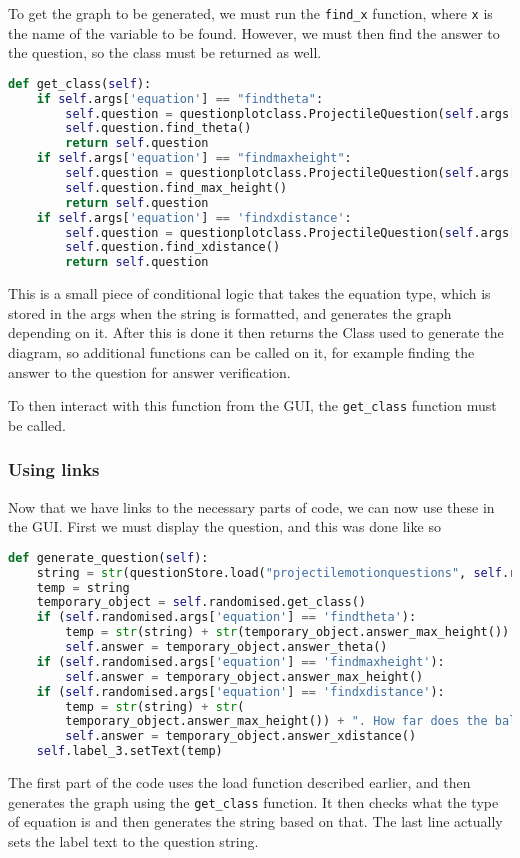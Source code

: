 To get the graph to be generated, we must run the \texttt{find\_x} function, where \texttt{x} is the name of the variable to be found. However, we must then find the answer to the question, so the class must be returned as well.
\begin{lstlisting}[language=Python, caption=Additional method in \texttt{Randomized class to generate graph and return class used to do this}]
def get_class(self):
	if self.args['equation'] == "findtheta":
		self.question = questionplotclass.ProjectileQuestion(self.args['b'], self.args['a'], random.randint(40, 60))
		self.question.find_theta()
		return self.question
	if self.args['equation'] == "findmaxheight":
		self.question = questionplotclass.ProjectileQuestion(self.args['c'], self.args['a'], self.args['b'])
		self.question.find_max_height()
		return self.question
	if self.args['equation'] == 'findxdistance':
		self.question = questionplotclass.ProjectileQuestion(self.args['c'], self.args['a'], self.args['b'])
		self.question.find_xdistance()
		return self.question
\end{lstlisting}
This is a small piece of conditional logic that takes the equation type, which is stored in the args when the string is formatted, and generates the graph depending on it. After this is done it then returns the Class used to generate the diagram, so additional functions can be called on it, for example finding the answer to the question for answer verification.

To then interact with this function from the GUI, the \texttt{get\_class} function must be called.
\subsubsection{Using links}
Now that we have links to the necessary parts of code, we can now use these in the GUI. First we must display the question, and this was done like so
\begin{lstlisting}[language=Python, caption=Generate and display question]
def generate_question(self):
	string = str(questionStore.load("projectilemotionquestions", self.randomised))
	temp = string
	temporary_object = self.randomised.get_class()
	if (self.randomised.args['equation'] == 'findtheta'):
		temp = str(string) + str(temporary_object.answer_max_height()) + " Find theta in degreees."
		self.answer = temporary_object.answer_theta()
	if (self.randomised.args['equation'] == 'findmaxheight'):
		self.answer = temporary_object.answer_max_height()
	if (self.randomised.args['equation'] == 'findxdistance'):
		temp = str(string) + str(
		temporary_object.answer_max_height()) + ". How far does the ball travel before it hits the ground?"
		self.answer = temporary_object.answer_xdistance()
	self.label_3.setText(temp)
\end{lstlisting}
The first part of the code uses the load function described earlier, and then generates the graph using the \texttt{get\_class} function. It then checks what the type of equation is and then generates the string based on that. The last line actually sets the label text to the question string.

